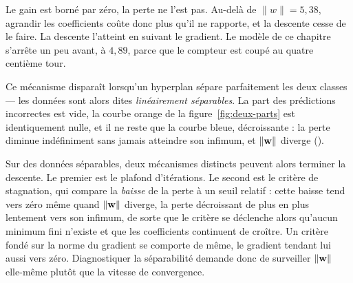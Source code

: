 Le gain est borné par zéro, la perte ne l'est pas. Au-delà de $\|w\|=5{,}38$,
agrandir les coefficients coûte donc plus qu'il ne rapporte, et la descente cesse
de le faire. La descente l'atteint en suivant le gradient. Le
modèle de ce chapitre s'arrête un peu avant, à $4{,}89$, parce que le compteur
est coupé au quatre centième tour.

Ce mécanisme disparaît lorsqu'un hyperplan sépare parfaitement les deux classes
--- les données sont alors dites \emph{linéairement séparables}. La part des
prédictions incorrectes est vide, la courbe orange de la
figure~\ref{fig:deux-parts} est identiquement nulle, et il ne reste que la courbe
bleue, décroissante : la perte diminue indéfiniment sans jamais atteindre son
infimum, et $\|\mathbf{w}\|$ diverge ().

Sur des données séparables, deux mécanismes distincts peuvent alors terminer la
descente. Le premier est le plafond d'itérations. Le second est le critère de
stagnation, qui compare la \emph{baisse} de la perte à un seuil relatif : cette
baisse tend vers zéro même quand $\|\mathbf{w}\|$ diverge, la perte décroissant de plus
en plus lentement vers son infimum, de sorte que le critère se déclenche alors
qu'aucun minimum fini n'existe et que les coefficients continuent de croître. Un
critère fondé sur la norme du gradient se comporte de même, le gradient tendant
lui aussi vers zéro. Diagnostiquer la séparabilité demande donc de surveiller
$\|\mathbf{w}\|$ elle-même plutôt que la vitesse de convergence.


